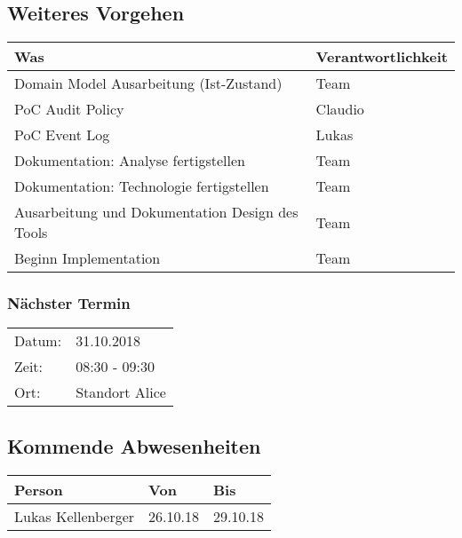 \subsection*{Weiteres Vorgehen}
\begin{table}[H]
    \centering
    \begin{tabular}{p{12cm} p{4cm}}
        \textbf{Was} & \textbf{Verantwortlichkeit} \\ \hline
        Domain Model Ausarbeitung (Ist-Zustand) & Team \\ \hline
        PoC Audit Policy & Claudio \\ \hline
        PoC Event Log & Lukas \\ \hline
        Dokumentation: Analyse fertigstellen & Team \\ \hline
        Dokumentation: Technologie fertigstellen & Team \\ \hline
        Ausarbeitung und Dokumentation Design des Tools & Team \\ \hline
        Beginn Implementation & Team \\ \hline
    \end{tabular}
\end{table}

\clearpage

\subsubsection*{Nächster Termin}

\begin{tabular}{p{4cm} p{12cm}}
    Datum: & 31.10.2018 \\
    Zeit: & 08:30 - 09:30 \\
    Ort: & Standort Alice \\
\end{tabular}

\vspace{1cm}

\subsection*{Kommende Abwesenheiten}
\begin{table}[H]
    \centering
    \begin{tabular}{p{6cm} p{5cm} p{5cm}}
        \textbf{Person} & \textbf{Von} & \textbf{Bis} \\ \hline
        Lukas Kellenberger & 26.10.18 & 29.10.18 \\ \hline
    \end{tabular}
\end{table}

